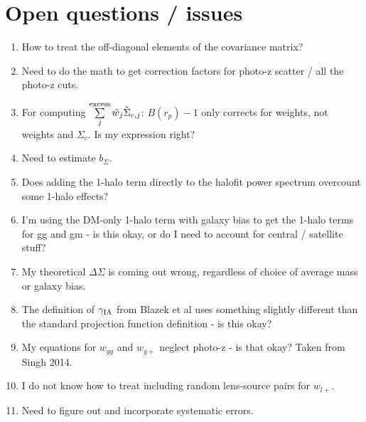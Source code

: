\documentclass[onecolumn,amsmath,aps,fleqn, superscriptaddress]{revtex4}
\begin{document}
\section{Open questions / issues}
\begin{enumerate}
\item{How to treat the off-diagonal elements of the covariance matrix?}
\item{Need to do the math to get correction factors for photo-z scatter / all the photo-z cuts.}
\item{For computing $\sum\limits_{j}^{\rm excess} \tilde{w}_j \tilde{\Sigma}_{c,j}$: $B(r_p) - 1$ only corrects for weights, not weights and $\Sigma_c$. Is my expression right?}
\item{Need to estimate $b_{\Sigma}$.}
\item{Does adding the 1-halo term directly to the halofit power spectrum overcount some 1-halo effects?}
\item{I'm using the DM-only 1-halo term with galaxy bias to get the 1-halo terms for gg and gm - is this okay, or do I need to account for central / satellite stuff?}
\item{My theoretical $\Delta \Sigma$ is coming out wrong, regardless of choice of average mass or galaxy bias.}
\item{The definition of $\gamma_{\rm IA}$ from Blazek et al uses something slightly different than the standard projection function definition - is this okay?}
\item{My equations for $w_{gg}$ and $w_{g+}$ neglect photo-z - is that okay? Taken from Singh 2014.}
\item{I do not know how to treat including random lens-source pairs for $w_{l+}$.}
\item{Need to figure out and incorporate systematic errors.}
\end{enumerate}











\end{document}
